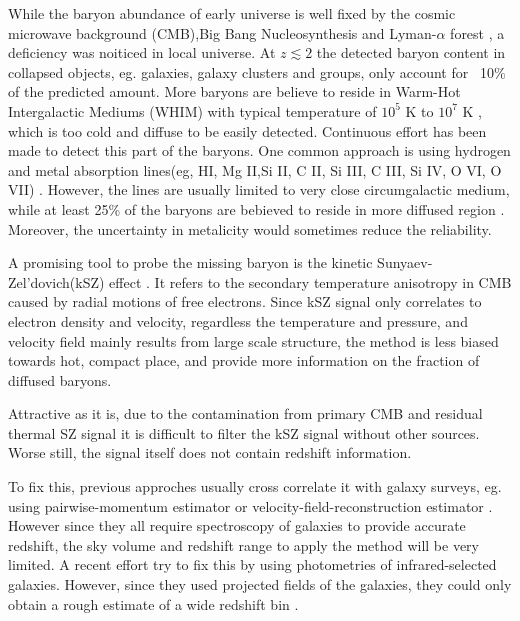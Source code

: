 While the baryon abundance of early universe is well fixed by the cosmic microwave background (CMB),Big Bang Nucleosynthesis and Lyman-$\alpha$ forest \cite{Cooke14}\cite{Fukugita98}\cite{Komatsu11}\cite{Hinshaw13}, 
a deficiency was noiticed in local universe.
At $z\lesssim 2$ the detected baryon content in collapsed
objects, eg. galaxies, galaxy clusters and groups, only account for ~10$\%$ of the predicted amount.
More baryons are believe to reside in Warm-Hot Intergalactic Mediums (WHIM) with typical temperature of $10^5$ K to $10^7$ K \cite{pen1998,Soltan06}, which is too cold and diffuse to be easily detected.
Continuous effort has been made to detect this part of the baryons. 
One common approach is using hydrogen and metal absorption lines(eg, HI, Mg II,Si II, C II, Si III, C III, Si IV, O VI, O VII) \cite{Fukugita04}\cite{Werk14}.
However, the lines are usually limited to very close circumgalactic medium, while at least 25\% of the baryons are bebieved to reside in more diffused region \cite{Dave10}. Moreover, the uncertainty in metalicity would sometimes reduce the reliability.

A promising tool to probe the missing baryon is the kinetic Sunyaev-Zel'dovich(kSZ) effect \cite{Sunyaev72}\cite{Sunyaev80}. 
It refers to the secondary temperature anisotropy in CMB caused by radial motions of free electrons.
Since kSZ signal only correlates to electron density and velocity, 
regardless the temperature and pressure, 
and velocity field mainly results from large scale structure, 
the method is less biased towards hot, compact place, 
and provide more information on the fraction of diffused baryons.

Attractive as it is, 
due to the contamination from primary CMB and residual thermal SZ signal
it is difficult to filter the kSZ signal without other sources. 
Worse still, the signal itself does not contain redshift information.

To fix this, previous approches usually cross correlate it with galaxy surveys, 
eg. using pairwise-momentum estimator \cite{Hand12} or velocity-field-reconstruction estimator \cite{Shao11}\cite{Li14}. 
However since they all require spectroscopy of galaxies to provide accurate redshift, the sky volume and redshift range to apply the method will be very limited. 
A recent effort try to fix this by using photometries of infrared-selected galaxies. 
However, since they used projected fields of the galaxies, they could only obtain a rough estimate of a wide redshift bin \cite{Hill16}.

